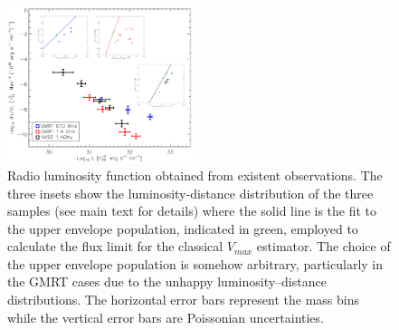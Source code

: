 \documentclass[traditabstract]{aa}
\begin{document}
\begin{appendix}
\begin{figure}[hbt!]
\centering
\includegraphics[width=0.48\textwidth]{figures/RLF_observatios.eps}
\caption{Radio luminosity function obtained from existent observations. The three insets show the luminosity-distance distribution of the three samples (see main text for details) where the solid line is the fit to the upper envelope population, indicated in green, employed to calculate the flux limit for the classical $V_{max}$ estimator. The choice of the upper envelope population is somehow arbitrary, particularly in the GMRT cases due to the unhappy luminosity--distance distributions. The horizontal error bars represent the mass bins while the vertical error bars are Poissonian uncertainties.}
\label{fig:RLFobs}
\end{figure}

\end{appendix}





\end{document}
